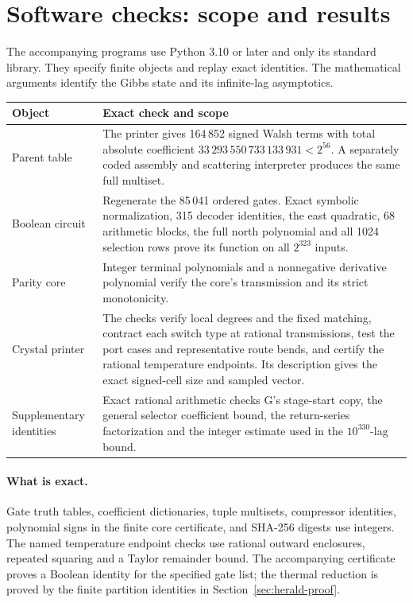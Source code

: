 \clearpage
\section{Software checks: scope and results}\label{sec:software-checks}

The accompanying programs use Python 3.10 or later and only its standard library. They specify finite objects and replay exact identities. The mathematical arguments identify the Gibbs state and its infinite-lag asymptotics.

\begin{center}
\small
\begin{tabular}{@{}p{.25\linewidth}p{.65\linewidth}@{}}
\toprule
Object & Exact check and scope \\
\midrule
Parent table & The printer gives 164\,852 signed Walsh terms with total absolute coefficient \(33\,293\,550\,733\,133\,931<2^{56}\). A separately coded assembly and scattering interpreter produces the same full multiset. \\
Boolean circuit & Regenerate the 85\,041 ordered gates. Exact symbolic normalization, 315 decoder identities, the east quadratic, 68 arithmetic blocks, the full north polynomial and all 1024 selection rows prove its function on all \(2^{323}\) inputs. \\
Parity core & Integer terminal polynomials and a nonnegative derivative polynomial verify the core's transmission and its strict monotonicity. \\
Crystal printer & The checks verify local degrees and the fixed matching, contract each switch type at rational transmissions, test the port cases and representative route bends, and certify the rational temperature endpoints. Its description gives the exact signed-cell size and sampled vector. \\
Supplementary identities & Exact rational arithmetic checks G's stage-start copy, the general selector coefficient bound, the return-series factorization and the integer estimate used in the \(10^{330}\)-lag bound. \\
\bottomrule
\end{tabular}
\end{center}

\paragraph{What is exact.}
Gate truth tables, coefficient dictionaries, tuple multisets, compressor identities, polynomial signs in the finite core certificate, and SHA-256 digests use integers. The named temperature endpoint checks use rational outward enclosures, repeated squaring and a Taylor remainder bound. The accompanying certificate proves a Boolean identity for the specified gate list; the thermal reduction is proved by the finite partition identities in Section~\ref{sec:herald-proof}.

